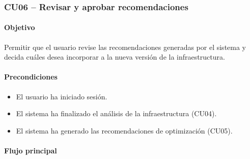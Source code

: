 \subsubsection{CU06 -- Revisar y aprobar recomendaciones}

\paragraph*{Objetivo}

Permitir que el usuario revise las recomendaciones generadas por el sistema y decida cuáles desea incorporar a la nueva versión de la infraestructura.

\paragraph*{Precondiciones}

\begin{itemize}
\item El usuario ha iniciado sesión.
\item El sistema ha finalizado el análisis de la infraestructura (CU04).
\item El sistema ha generado las recomendaciones de optimización (CU05).
\end{itemize}

\paragraph*{Flujo principal}

